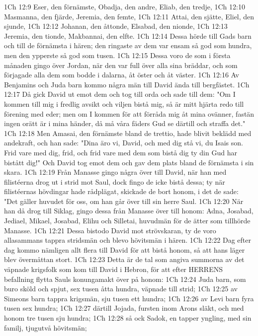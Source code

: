 1Ch 12:9  Eser, den förnämste, Obadja, den andre, Eliab, den tredje,
1Ch 12:10  Masmanna, den fjärde, Jeremia, den femte,
1Ch 12:11  Attai, den sjätte, Eliel, den sjunde,
1Ch 12:12  Johanan, den åttonde, Elsabad, den nionde,
1Ch 12:13  Jeremia, den tionde, Makbannai, den elfte.
1Ch 12:14  Dessa hörde till Gads barn och till de förnämsta i hären; den ringaste av dem var ensam så god som hundra, men den ypperste så god som tusen.
1Ch 12:15  Dessa voro de som i första månaden gingo över Jordan, när den var full över alla sina bräddar, och som förjagade alla dem som bodde i dalarna, åt öster och åt väster.
1Ch 12:16  Av Benjamins och Juda barn kommo några män till David ända till bergfästet.
1Ch 12:17  Då gick David ut emot dem och tog till orda och sade till dem: "Om I kommen till mig i fredlig avsikt och viljen bistå mig, så är mitt hjärta redo till förening med eder; men om I kommen för att förråda mig åt mina ovänner, fastän ingen orätt är i mina händer, då må våra fäders Gud se därtill och straffa det."
1Ch 12:18  Men Amasai, den förnämste bland de trettio, hade blivit beklädd med andekraft, och han sade: "Dina äro vi, David, och med dig stå vi, du Isais son. Frid vare med dig, frid, och frid vare med dem som bistå dig ty din Gud har bistått dig!" Och David tog emot dem och gav dem plats bland de förnämsta i sin skara.
1Ch 12:19  Från Manasse gingo några över till David, när han med filistéerna drog ut i strid mot Saul, dock fingo de icke bistå dessa; ty när filistéernas hövdingar hade rådplägat, skickade de bort honom, i det de sade: "Det gäller huvudet för oss, om han går över till sin herre Saul.
1Ch 12:20  När han då drog till Siklag, gingo dessa från Manasse över till honom: Adna, Josabad, Jediael, Mikael, Josabad, Elihu och Silletai, huvudmän för de ätter som tillhörde Manasse.
1Ch 12:21  Dessa bistodo David mot strövskaran, ty de voro allasammans tappra stridsmän och blevo hövitsmän i hären.
1Ch 12:22  Dag efter dag kommo nämligen allt flera till David för att bistå honom, så att hans läger blev övermåttan stort.
1Ch 12:23  Detta är de tal som angiva summorna av det väpnade krigsfolk som kom till David i Hebron, för att efter HERRENS befallning flytta Sauls konungamakt över på honom:
1Ch 12:24  Juda barn, som buro sköld och spjut, sex tusen åtta hundra, väpnade till strid;
1Ch 12:25  av Simeons barn tappra krigsmän, sju tusen ett hundra;
1Ch 12:26  av Levi barn fyra tusen sex hundra;
1Ch 12:27  därtill Jojada, fursten inom Arons släkt, och med honom tre tusen sju hundra;
1Ch 12:28  så ock Sadok, en tapper yngling, med sin familj, tjugutvå hövitsmän;

